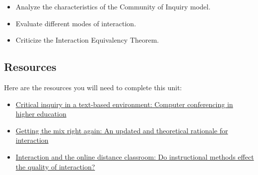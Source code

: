 \documentclass[
]{book}
\providecommand{\tightlist}{%
  \setlength{\itemsep}{0pt}\setlength{\parskip}{0pt}}
\begin{document}
\begin{itemize}
\tightlist
\item
  Analyze the characteristics of the Community of Inquiry model.
\item
  Evaluate different modes of interaction.
\item
  Criticize the Interaction Equivalency Theorem.
\end{itemize}

\hypertarget{resources-1}{%
\subsection*{Resources}\label{resources-1}}

Here are the resources you will need to complete this unit:

\begin{itemize}
\tightlist
\item
  \href{https://www-sciencedirect-com.twu.idm.oclc.org/science/article/pii/S1096751600000166}{Critical inquiry in a text-based environment: Computer conferencing in higher education}\\
\item
  \href{http://www.irrodl.org/index.php/irrodl/article/view/149/230}{Getting the mix right again: An updated and theoretical rationale for interaction}\\
\item
  \href{https://rdcu.be/cKSGf}{Interaction and the online distance classroom: Do instructional methods effect the quality of interaction?}
\end{itemize}
\end{document}
